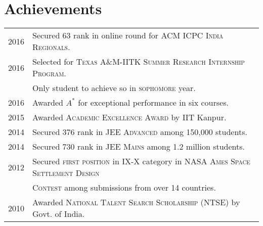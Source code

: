 \documentclass[a4paper,10pt]{article}
\begin{document}
\section{Achievements}
\begin{tabular}{rl}
2016 & Secured 63 rank in online round for \textsc{ACM ICPC India Regionals}.\\
2016 & Selected for \textsc{Texas A\&M-IITK Summer Research Internship Program}.\\ 
& Only student to achieve so in \textsc{sophomore} year.\\
2016 & Awarded $A^*$ for exceptional performance in six courses.\\
2015 & Awarded \textsc{Academic Excellence Award} by IIT Kanpur.\\
2014 & Secured 376 rank in \textsc{JEE Advanced} among 150,000 students.\\
2014 & Secured 730 rank in \textsc{JEE Mains} among 1.2 million students. \\
2012 & Secured \textsc{first position} in IX-X category in \textsc{NASA Ames Space Settlement Design}\\
&\textsc{Contest} among submissions from over 14 countries.\\
2010 & Awarded \textsc{National Talent Search Scholarship} (NTSE) by Govt. of India.

\end{tabular}
\end{document}
